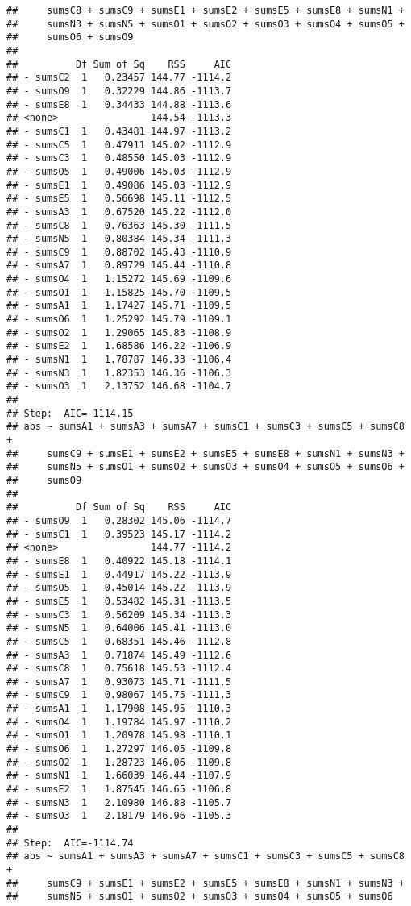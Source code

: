 \documentclass[,man,floatsintext]{apa6}
\begin{document}
\begin{verbatim}
##     sumsC8 + sumsC9 + sumsE1 + sumsE2 + sumsE5 + sumsE8 + sumsN1 + 
##     sumsN3 + sumsN5 + sumsO1 + sumsO2 + sumsO3 + sumsO4 + sumsO5 + 
##     sumsO6 + sumsO9
## 
##          Df Sum of Sq    RSS     AIC
## - sumsC2  1   0.23457 144.77 -1114.2
## - sumsO9  1   0.32229 144.86 -1113.7
## - sumsE8  1   0.34433 144.88 -1113.6
## <none>                144.54 -1113.3
## - sumsC1  1   0.43481 144.97 -1113.2
## - sumsC5  1   0.47911 145.02 -1112.9
## - sumsC3  1   0.48550 145.03 -1112.9
## - sumsO5  1   0.49006 145.03 -1112.9
## - sumsE1  1   0.49086 145.03 -1112.9
## - sumsE5  1   0.56698 145.11 -1112.5
## - sumsA3  1   0.67520 145.22 -1112.0
## - sumsC8  1   0.76363 145.30 -1111.5
## - sumsN5  1   0.80384 145.34 -1111.3
## - sumsC9  1   0.88702 145.43 -1110.9
## - sumsA7  1   0.89729 145.44 -1110.8
## - sumsO4  1   1.15272 145.69 -1109.6
## - sumsO1  1   1.15825 145.70 -1109.5
## - sumsA1  1   1.17427 145.71 -1109.5
## - sumsO6  1   1.25292 145.79 -1109.1
## - sumsO2  1   1.29065 145.83 -1108.9
## - sumsE2  1   1.68586 146.22 -1106.9
## - sumsN1  1   1.78787 146.33 -1106.4
## - sumsN3  1   1.82353 146.36 -1106.3
## - sumsO3  1   2.13752 146.68 -1104.7
## 
## Step:  AIC=-1114.15
## abs ~ sumsA1 + sumsA3 + sumsA7 + sumsC1 + sumsC3 + sumsC5 + sumsC8 + 
##     sumsC9 + sumsE1 + sumsE2 + sumsE5 + sumsE8 + sumsN1 + sumsN3 + 
##     sumsN5 + sumsO1 + sumsO2 + sumsO3 + sumsO4 + sumsO5 + sumsO6 + 
##     sumsO9
## 
##          Df Sum of Sq    RSS     AIC
## - sumsO9  1   0.28302 145.06 -1114.7
## - sumsC1  1   0.39523 145.17 -1114.2
## <none>                144.77 -1114.2
## - sumsE8  1   0.40922 145.18 -1114.1
## - sumsE1  1   0.44917 145.22 -1113.9
## - sumsO5  1   0.45014 145.22 -1113.9
## - sumsE5  1   0.53482 145.31 -1113.5
## - sumsC3  1   0.56209 145.34 -1113.3
## - sumsN5  1   0.64006 145.41 -1113.0
## - sumsC5  1   0.68351 145.46 -1112.8
## - sumsA3  1   0.71874 145.49 -1112.6
## - sumsC8  1   0.75618 145.53 -1112.4
## - sumsA7  1   0.93073 145.71 -1111.5
## - sumsC9  1   0.98067 145.75 -1111.3
## - sumsA1  1   1.17908 145.95 -1110.3
## - sumsO4  1   1.19784 145.97 -1110.2
## - sumsO1  1   1.20978 145.98 -1110.1
## - sumsO6  1   1.27297 146.05 -1109.8
## - sumsO2  1   1.28723 146.06 -1109.8
## - sumsN1  1   1.66039 146.44 -1107.9
## - sumsE2  1   1.87545 146.65 -1106.8
## - sumsN3  1   2.10980 146.88 -1105.7
## - sumsO3  1   2.18179 146.96 -1105.3
## 
## Step:  AIC=-1114.74
## abs ~ sumsA1 + sumsA3 + sumsA7 + sumsC1 + sumsC3 + sumsC5 + sumsC8 + 
##     sumsC9 + sumsE1 + sumsE2 + sumsE5 + sumsE8 + sumsN1 + sumsN3 + 
##     sumsN5 + sumsO1 + sumsO2 + sumsO3 + sumsO4 + sumsO5 + sumsO6

\end{verbatim}
\end{document}
